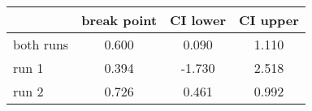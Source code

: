 \documentclass{article}
\begin{document}
\begin{table}[ht]
\centering
\begin{tabular}{lccc}
  \hline
 & break point & CI lower & CI upper \\ 
  \hline
both runs & 0.600 & 0.090 & 1.110 \\ 
  run 1 & 0.394 & -1.730 & 2.518 \\ 
  run 2 & 0.726 & 0.461 & 0.992 \\ 
   \hline
\end{tabular}
\end{table}
\end{document}
